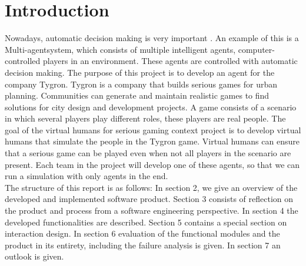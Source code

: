 \section{Introduction}
Nowadays, automatic decision making is very important \cite{Lizheng2010}. An example of this is a Multi-agentsystem, which consists of multiple intelligent agents, computer-controlled players in an environment. These agents are controlled with automatic decision making. The purpose of this project is to develop an agent for the company Tygron. Tygron is a company that builds serious games for urban planning. Communities can generate and maintain realistic games to find solutions for city design and development projects. A game consists of a scenario in which several players play different roles, these players are real people. The goal of the virtual humans for serious gaming context project is to develop virtual humans that simulate the people in the Tygron game. Virtual humans can ensure that a serious game can be played even when not all players in the scenario are present. Each team in the project will develop one of these agents, so that we can run a simulation with only agents in the end.\\

The structure of this report is as follows:
In section 2, we give an overview of the developed and implemented software product. Section 3 consists of reflection on the product and process from a software engineering perspective. In section 4 the developed functionalities are described. Section 5 contains a special section on interaction design. In section 6 evaluation of the functional modules and the product in its entirety, including the failure analysis is given. In section 7 an outlook is given.
